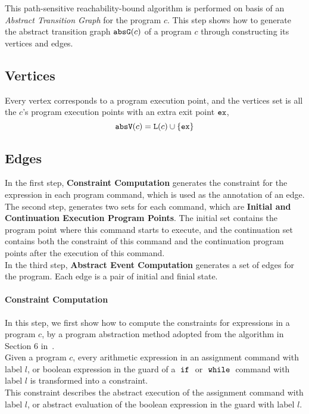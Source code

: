 This path-sensitive reachability-bound algorithm
is performed on basis of an \emph{Abstract Transition Graph} for the program $c$.
This step shows how to generate the abstract transition graph $\mathtt{abs}{\mathtt{G}}(c)$ of a
program $c$ through constructing its vertices and edges.

\subsection{Vertices}
\label{sec:abs_prog-vertex}
Every 
vertex corresponds to a program execution point, 
and the vertices set is all the $c$'s program execution points with an extra exit point ${\mathtt{ex}}$, 
\[ 
  \mathtt{abs}{\mathtt{V}}(c) = \mathtt{L}(c)\cup\{{\mathtt{ex}}\}
  \]

\subsection{Edges}
\label{sec:abs_prog-edge}
  In the first step, \textbf{Constraint Computation} generates the constraint
  for the expression in each program command,
  which is used as the annotation of an edge.
  \\
The second step, generates two sets for each command, which are \textbf{Initial and Continuation Execution Program Points}. 
  The initial set contains the
  program point where this command {starts} to execute, 
  and the continuation set contains both the constraint of this command
  and the continuation program points after the execution of this command.
  \\ 
  In the third step, \textbf{Abstract Event Computation} generates a set of edges for the program.
  Each edge is a pair of initial and finial state.
%
\paragraph{Constraint Computation}
In this step, we first show how to compute the constraints for expressions in a program $c$,
by a program abstraction method adopted from the
algorithm in Section 6 in~\cite{SinnZV17}.
\\
Given a program $c$,
every arithmetic expression in an assignment command with label $l$,
or boolean expression in the guard of a $\;\mathtt{if}\;$ or $\;\mathtt{while}\;$ command with label $l$
is transformed into a constraint.
\\
This constraint describes the abstract execution of the assignment command with label $l$,
or abstract evaluation of the boolean expression in the guard with label $l$.

